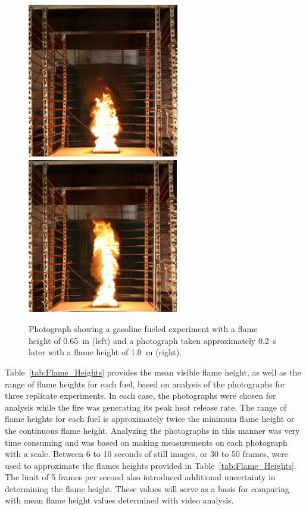 \documentclass[twoside]{uocthesis}
\begin{document}
{\begin{figure}
  \includegraphics[width=2.6in]{../Figures/Gaso_0_65m}
  \includegraphics[width=2.6in]{../Figures/Gaso_1_0m} \\
  \caption[Photographs of the gasoline fire]{Photograph showing a gasoline fueled experiment with a flame height of 0.65~m (left) and a photograph taken approximately 0.2~s later with a flame height of 1.0~m (right).}
  \label{Gasoline_Photos}
\end{figure}


Table~\ref{tab:Flame_Heights} provides the mean visible flame height, as well as the range of flame heights for each fuel, based on analysis of the photographs for three replicate experiments.  In each case, the photographs were chosen for analysis while the fire was generating its peak heat release rate.  The range of flame heights for each fuel is approximately twice the minimum flame height or the continuous flame height. Analyzing the photographs in this manner was very time consuming and was based on making measurements on each photograph with a scale.  Between 6 to 10 seconds of still images, or 30 to 50 frames, were used to approximate the flames heights provided in Table~\ref{tab:Flame_Heights}.  The limit of 5 frames per second also introduced additional uncertainty in determining the flame height. These values will serve as a basis for comparing with mean flame height values determined with video analysis.

}
\end{document}
